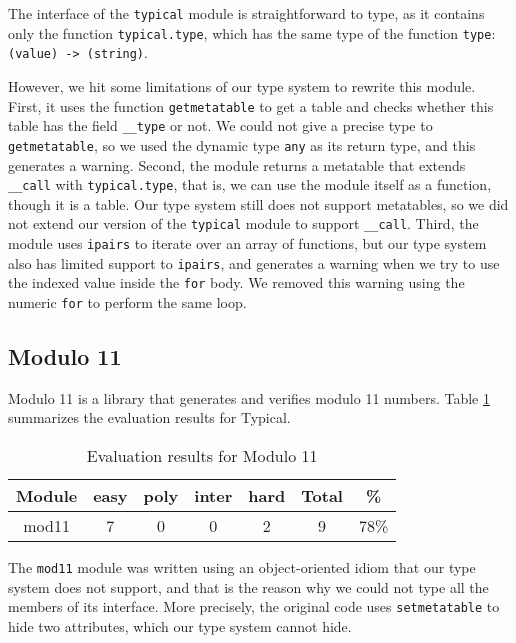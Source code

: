The interface of the \texttt{typical} module is straightforward to type,
as it contains only the function \texttt{typical.type},
which has the same type of the function \texttt{type}: \texttt{(value) -> (string)}.

However, we hit some limitations of our type system to rewrite this module.
First, it uses the function \texttt{getmetatable} to get a table and
checks whether this table has the field \texttt{\string_\string_type} or not.
We could not give a precise type to \texttt{getmetatable}, so we used the dynamic
type \texttt{any} as its return type, and this generates a warning.
Second, the module returns a metatable that extends \texttt{\string_\string_call}
with \texttt{typical.type}, that is, we can use the module itself as a function,
though it is a table.
Our type system still does not support metatables, so we did not extend our version
of the \texttt{typical} module to support \texttt{\string_\string_call}.
Third, the module uses \texttt{ipairs} to iterate over an array of functions,
but our type system also has limited support to \texttt{ipairs}, and generates
a warning when we try to use the indexed value inside the \texttt{for} body.
We removed this warning using the numeric \texttt{for} to perform the same loop.

\subsection{Modulo 11}

Modulo 11 is a library that generates and verifies modulo 11 numbers.
Table \ref{tab:evalmod11} summarizes the evaluation results for Typical.

\begin{table}[!ht]
\begin{center}
\begin{tabular}{|c|c|c|c|c|c|c|}
\hline
\textbf{Module} & \textbf{easy} & \textbf{poly} & \textbf{inter} & \textbf{hard} & \textbf{Total} & \textbf{\%} \\
\hline
mod11 & 7 & 0 & 0 & 2 & 9 & 78\% \\
\hline
\end{tabular}
\end{center}
\caption{Evaluation results for Modulo 11}
\label{tab:evalmod11}
\end{table}

The \texttt{mod11} module was written using an object-oriented idiom that
our type system does not support, and that is the reason why we could not
type all the members of its interface.
More precisely, the original code uses \texttt{setmetatable} to hide
two attributes, which our type system cannot hide.

